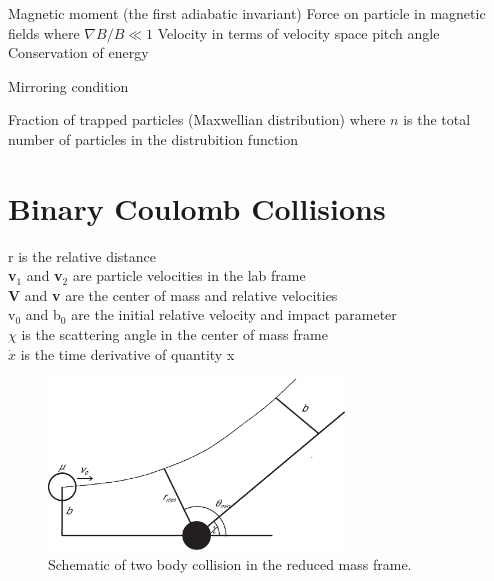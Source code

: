 \noindent
Magnetic moment (the first adiabatic invariant) 
Force on particle in magnetic fields where $\nabla B/B \ll 1$ 
Velocity in terms of velocity space pitch angle 
Conservation of energy 

\noindent
Mirroring condition 

\noindent
Fraction of trapped particles (Maxwellian distribution) 
where $n$ is the total number of particles in the distrubition function


\section{Binary Coulomb Collisions}

\noindent r is the relative distance\\
\textbf{v}$_1$ and \textbf{v}$_2$ are particle velocities in the lab
frame\\
\textbf{V} and \textbf{v} are the center of mass and relative
velocities\\
v$_0$ and b$_0$ are the initial relative velocity and impact parameter\\
$\chi$ is the scattering angle in the center of mass frame\\
$\dot{x}$ is the time derivative of quantity x\\

\begin{figure}[h!]
  \centering
  \includegraphics[width = 0.7\textwidth]{figures/twoBodyCollision.eps}
  \caption*{Schematic of two body collision in the reduced mass frame.}
  \label{fig:2body_collision}
\end{figure}


